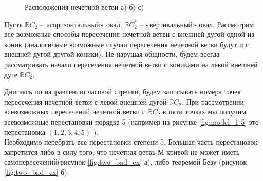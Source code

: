\documentclass[11pt]{book}
\numberwithin{exercise}{chapter}
\begin{document}
\begin{figure}[H]
\caption{Расположения нечетной ветви а) б) с)}
\label{fig:curves_with_ovals}
\end{figure}

Пусть $\mathbb RC_2$ – «горизонтальный» овал, $\mathbb RC_2^*$ – «вертикальный» овал. Рассмотрим все возможные способы пересечения нечетной ветви с внешней дугой одной из коник (аналогичные возможные случаи пересечения нечетной ветви будут и с внешней дугой другой коники). Не нарушая общности, будем всегда рассматривать начало пересечения нечетной ветви с кониками на левой внешней дуге $\mathbb RC_2$. 

Двигаясь по направлению часовой стрелки, будем записывать номера точек пересечения нечетной ветви с левой внешней дугой $\mathbb RC_2$. При рассмотрении всевозможных пересечений нечетной ветви с $\mathbb RC_2$ в пяти точках мы получим всевозможные перестановки порядка 5 (например на рисунке \ref{fig:model_1-5} это перестановка $(1,2,3,4,5)$ ).
\\
Необходимо перебрать все перестановки степени 5. Большая часть перестановок запретится либо в силу того, что нечётная ветвь М-кривой не может иметь самопересечений(рисунок \ref{fig:two_bad_ex} а), либо теоремой Безу (рисунок \ref{fig:two_bad_ex} б).
\end{document}
